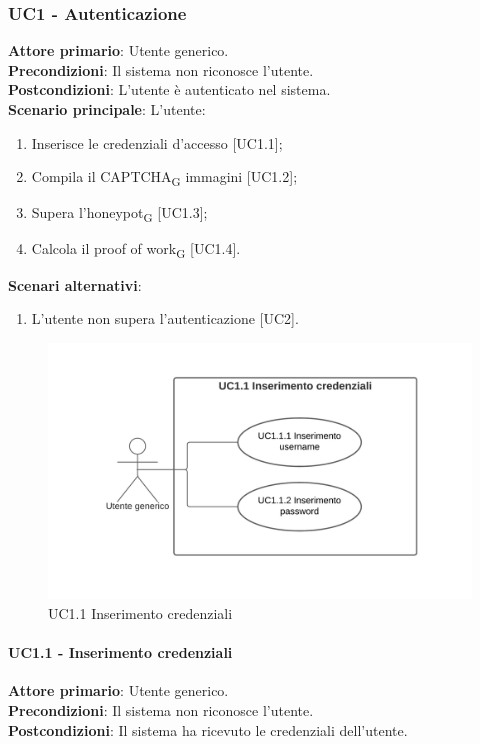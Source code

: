 \subsubsection{UC1 - Autenticazione}
\textbf{Attore primario}: Utente generico.\\
\textbf{Precondizioni}: Il sistema non riconosce l'utente.\\
\textbf{Postcondizioni}: L'utente è autenticato nel sistema.\\

\textbf{Scenario principale}: L'utente:
\begin{enumerate}
\item Inserisce le credenziali d'accesso [UC1.1];
\item Compila il CAPTCHA\textsubscript{G} immagini [UC1.2];
\item Supera l'honeypot\textsubscript{G} [UC1.3];
\item Calcola il proof of work\textsubscript{G} [UC1.4].
\end{enumerate}

\textbf{Scenari alternativi}:
\begin{enumerate}
    \item L’utente non supera l'autenticazione [UC2].
\end{enumerate}

\begin{figure}[H]
    \centering
    \includegraphics[scale=0.8]{img/inserimento_credenziali.png}
    \caption{UC1.1 Inserimento credenziali}
\end{figure}

\paragraph{UC1.1 - Inserimento credenziali}
\textbf{Attore primario}: Utente generico.\\
\textbf{Precondizioni}: Il sistema non riconosce l'utente.\\
\textbf{Postcondizioni}: Il sistema ha ricevuto le credenziali dell'utente.\\

